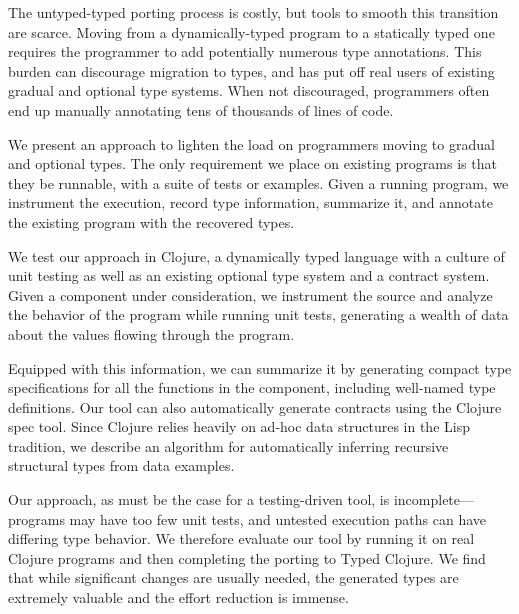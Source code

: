 %


The untyped-typed porting process is costly, but tools to smooth
this transition are scarce.  Moving from a dynamically-typed program
to a statically typed one requires the programmer to add potentially
numerous type annotations. This burden can discourage migration to
types, and has put off real users of existing gradual and optional
type systems. When not discouraged, programmers often end up
manually annotating tens of thousands of lines of code.

We present an approach to lighten the load on programmers moving to
gradual and optional types. The only requirement we place on existing
programs is that they be runnable, with a suite of tests or
examples. Given a running program, we instrument the execution, record
type information, summarize it, and annotate the existing program with
the recovered types.

We test our approach in Clojure, a dynamically typed
language with a culture of unit testing as well as an  existing
optional type system and a contract system. Given a component under
consideration, we instrument the source and analyze the behavior of the
program while running unit tests, generating a wealth of data about
the values flowing through the program.

Equipped with this information, we can summarize it by generating compact
type specifications for all the functions in the component, including
well-named type definitions. Our tool can also automatically generate
contracts using the Clojure spec tool. Since Clojure relies
heavily on ad-hoc data structures in the Lisp tradition, we describe
an algorithm for automatically inferring recursive structural types
from data examples.

Our approach, as must be the case for a testing-driven tool, is
incomplete---programs may have too few unit tests, and untested
execution paths can have differing type behavior. We therefore
evaluate our tool by running it on real Clojure programs and then
completing the porting to Typed Clojure. We find that while
significant changes are usually needed, the generated types are
extremely valuable and the effort reduction is immense.

